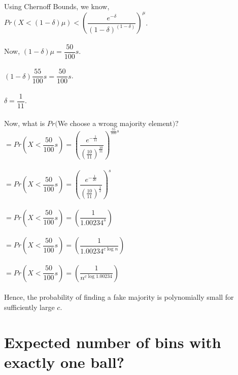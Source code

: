 \documentclass{article}
\begin{document}
Using Chernoff Bounds, we know,\\
$Pr(X < (1-\delta)\mu) < \left(\dfrac{e^{-\delta}}{(1-\delta)^{(1-\delta)}}\right)^\mu$.\\
\\
Now, $(1-\delta)\mu = \dfrac{50}{100}s$.\\
\\
$(1-\delta)\dfrac{55}{100}s = \dfrac{50}{100}s$.\\
\\
$\delta = \dfrac{1}{11}$.\\
\\
Now, what is $Pr($We choose a wrong majority element$)?$\\
$ = Pr(X < \dfrac{50}{100}s) = \left(\dfrac{e^{-\frac{1}{11}}}{(\frac{10}{11})^{\frac{10}{11}}}\right)^{\frac{55}{100}s}$\\
\\$ = Pr(X < \dfrac{50}{100}s) = \left(\dfrac{e^{-\frac{1}{20}}}{(\frac{10}{11})^{\frac{1}{2}}}\right)^s$\\
\\$ = Pr(X < \dfrac{50}{100}s) = \left(\dfrac{1}{1.00234^{s}}\right)$\\
\\$ = Pr(X < \dfrac{50}{100}s) = \left(\dfrac{1}{1.00234^{c\log{n}}}\right)$\\
\\$ = Pr(X < \dfrac{50}{100}s) = \left(\dfrac{1}{n^{c\log{1.00234}}}\right)$\\
\\
Hence, the probability of finding a fake majority is polynomially small for sufficiently large $c$.
\clearpage

\section{Expected number of bins with exactly one ball?}
\end{document}
